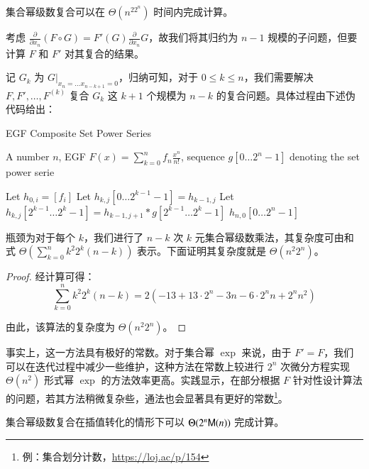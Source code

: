 \begin{theorem} \label{setcomp}
集合幂级数复合可以在 $\Theta(n^22^n)$ 时间内完成计算。
\end{theorem}

考虑 $\frac{\partial}{\partial x_n} (F \circ G) = F'(G)\frac{\partial}{\partial x_n} G$，故我们将其归约为 $n-1$ 规模的子问题，但要计算 $F$ 和 $F'$ 对其复合的结果。

记 $G_k$ 为 $\left. G \right |_{x_n = \dots x_{n-k+1}=0}$，归纳可知，对于 $0\le k\le n$，我们需要解决 $F, F', \dots, F^{(k)}$ 复合 $G_k$ 这 $k+1$ 个规模为 $n-k$ 的复合问题。具体过程由下述伪代码给出：

\begin{breakablealgorithm}
  \caption{EGF Composite Set Power Series}
  \begin{algorithmic}[1]
    \REQUIRE A number $n$, EGF $F(x)=\sum_{k=0}^n f_n \frac{x^n}{n!}$, sequence $g[0\dots 2^n-1]$ denoting the set power serie

      \STATE Let $h_{0,i} = [f_i]$
    \ENDFOR
        \STATE Let $h_{k,j}[0\dots 2^{k-1}-1] = h_{k-1,j}$
        \STATE Let $h_{k,j}[2^{k-1}\dots 2^k-1] = h_{k-1,j+1} * g[2^{k-1}\dots 2^k-1]$
      \ENDFOR
    \ENDFOR
    \RETURN $h_{n,0}[0\dots 2^n-1]$
  \end{algorithmic}
\end{breakablealgorithm}

瓶颈为对于每个 $k$，我们进行了 $n-k$ 次 $k$ 元集合幂级数乘法，其复杂度可由和式 $\Theta \left(\sum_{k=0}^n k^2 2^k (n-k)\right)$ 表示。下面证明其复杂度就是 $\Theta(n^2 2^n)$。

\begin{proof}
经计算可得：
$$
\sum_{k=0}^n k^2 2^k (n-k) = 2(-13 + 13\cdot 2^n - 3n - 6\cdot 2^n n+ 2^n n^2)
$$

由此，该算法的复杂度为 $\Theta(n^2 2^n)$。
\end{proof}

事实上，这一方法具有极好的常数。对于集合幂 $\exp$ 来说，由于 $F'=F$，我们可以在迭代过程中减少一些维护，这种方法在常数上较进行 $2^n$ 次微分方程实现 $\Theta(n^2)$ 形式幂 $\exp$ 的方法效率更高。实践显示，在部分根据 $F$ 针对性设计算法的问题，若其方法稍微复杂些，通法也会显著具有更好的常数\footnote{例：集合划分计数，\url{https://loj.ac/p/154}}。

\begin{lemma}
集合幂级数复合在插值转化的情形下可以 $\Theta(2^n\mathsf M(n))$ 完成计算。
\end{lemma}

